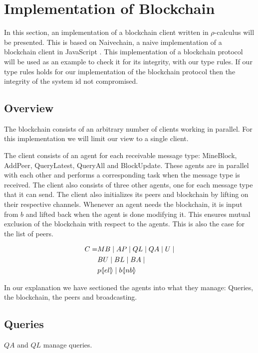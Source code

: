 \section{Implementation of Blockchain}
In this section, an implementation of a blockchain client written in $\rho$-calculus will be presented.
This is based on Naivechain, a naive implementation of a blockchain client in JavaScript \cite{naivechain}.
This implementation of a blockchain protocol will be used as an example to check it for its integrity, with our type rules.
If our type rules holds for our implementation of the blockchain protocol then the integrity of the system id not compromised.

\subsection{Overview}

The blockchain consists of an arbitrary number of clients working in parallel. For this implementation we will limit our view to a single client.

The client consists of an agent for each receivable message type: MineBlock, AddPeer, QueryLatest, QueryAll and BlockUpdate.
These agents are in parallel with each other and performs a corresponding task when the message type is received.
The client also consists of three other agents, one for each message type that it can send.
The client also initializes its peers and blockchain by lifting on their respective channels.
Whenever an agent needs the blockchain, it is input from $b$ and lifted back when the agent is done modifying it.
This ensures mutual exclusion of the blockchain with respect to the agents.
This is also the case for the list of peers.

\begin{align*}
    C =& MB \mid AP \mid QL \mid QA \mid U \mid\\
    & BU \mid BL \mid BA \mid \\
    & p \langle \! | el | \! \rangle \mid b \langle \! | nb | \! \rangle
\end{align*}

In our explanation we have sectioned the agents into what they manage: Queries, the blockchain, the peers and broadcasting.

\subsection{Queries}

$QA$ and $QL$ manage queries.

